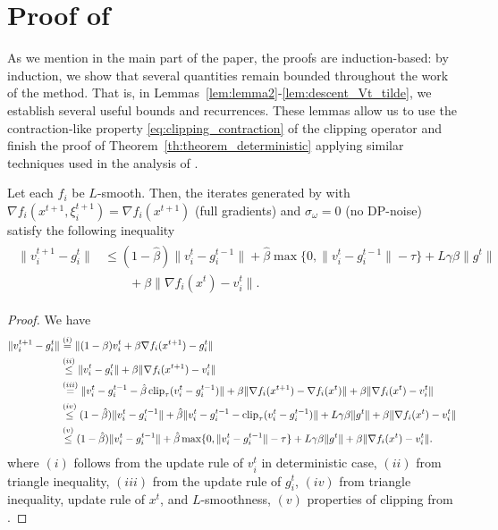 \documentclass[a4paper,11pt]{article}
\begin{document}
\section{Proof of }\label{appendix:proof_deterministic}

As we mention in the main part of the paper, the proofs are induction-based: by induction, we show that several quantities remain bounded throughout the work of the method. That is, in Lemmas~\ref{lem:lemma2}-\ref{lem:descent_Vt_tilde}, we establish several useful bounds and recurrences. These lemmas allow us to use the contraction-like property \eqref{eq:clipping_contraction} of the clipping operator and finish the proof of Theorem~\ref{th:theorem_deterministic} applying similar techniques used in the analysis of .

\begin{lemma}\label{lem:lemma2} Let each $f_i$ be $L$-smooth. Then, the iterates generated by  with\\$\nabla f_i(x^{t+1},\xi^{t+1}_i) = \nabla f_i(x^{t+1})$ (full gradients) and $\sigma_{\omega} = 0$ (no DP-noise) satisfy the following inequality 
\begin{align}
\begin{aligned}
    \|v_i^{t+1} - g_i^t\| &\le (1-\hat{\beta})\|v_i^t - g_i^{t-1}\|
         + \hat{\beta}\max\{0, \|v_i^t - g_i^{t-1}\| - \tau\}
         + L\gamma\beta \|g^t\|\\
         & \qquad + \beta\|\nabla f_i(x^t) - v_i^t\|.
\end{aligned}
\end{align}
\end{lemma}
\begin{proof}
    We have 
    \begin{align*}
        \|v_i^{t+1} - g_i^t\| &\overset{(i)}{=} \|(1-\beta)v_i^t + \beta\nabla f_i(x^{t+1}) - g_i^t\|\\
        &\overset{(ii)}{\le} \|v_i^t-g_i^t\| + \beta\|\nabla f_i(x^{t+1}) - v_i^t\|\\
        &\overset{(iii)}{=} 
        \|v_i^t - g_i^{t-1} - \hat{\beta}\operatorname{clip}_{\tau}(v_i^t - g_i^{t-1})\| 
        + \beta\|\nabla f_i(x^{t+1}) - \nabla f_i(x^t)\|
        + \beta\|\nabla f_i(x^t) - v_i^t\|\\
        &\overset{(iv)}{\le } 
        (1-\hat{\beta})\|v_i^t - g_i^{t-1}\| 
        + \hat{\beta}\|v_i^t - g_i^{t-1} - \operatorname{clip}_{\tau}(v_i^t - g_i^{t-1})\|
        + L\gamma\beta \|g^t\|
        + \beta\|\nabla f_i(x^t) - v_i^t\|\\
        &\overset{(v)}{\le} 
         (1-\hat{\beta})\|v_i^t - g_i^{t-1}\|
         + \hat{\beta}\max\{0, \|v_i^t - g_i^{t-1}\| - \tau\}
         + L\gamma\beta \|g^t\|
        + \beta\|\nabla f_i(x^t) - v_i^t\|.
    \end{align*}
    where $(i)$ follows from the update rule of $v_i^t$ in deterministic case, $(ii)$ from triangle inequality, $(iii)$ from the update rule of $g_i^t$, $(iv)$ from triangle inequality, update rule of $x^t$, and $L$-smoothness, $(v)$ properties of clipping from .
\end{proof}
    
\end{document}

